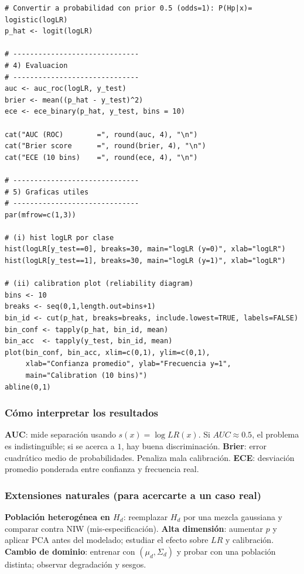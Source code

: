 \documentclass[a4paper,10pt,oneside]{article}
\begin{document}
\begin{verbatim}
# Convertir a probabilidad con prior 0.5 (odds=1): P(Hp|x)= logistic(logLR)
p_hat <- logit(logLR)

# ------------------------------
# 4) Evaluacion
# ------------------------------
auc <- auc_roc(logLR, y_test)
brier <- mean((p_hat - y_test)^2)
ece <- ece_binary(p_hat, y_test, bins = 10)

cat("AUC (ROC)        =", round(auc, 4), "\n")
cat("Brier score      =", round(brier, 4), "\n")
cat("ECE (10 bins)    =", round(ece, 4), "\n")

# ------------------------------
# 5) Graficas utiles
# ------------------------------
par(mfrow=c(1,3))

# (i) hist logLR por clase
hist(logLR[y_test==0], breaks=30, main="logLR (y=0)", xlab="logLR")
hist(logLR[y_test==1], breaks=30, main="logLR (y=1)", xlab="logLR")

# (ii) calibration plot (reliability diagram)
bins <- 10
breaks <- seq(0,1,length.out=bins+1)
bin_id <- cut(p_hat, breaks=breaks, include.lowest=TRUE, labels=FALSE)
bin_conf <- tapply(p_hat, bin_id, mean)
bin_acc  <- tapply(y_test, bin_id, mean)
plot(bin_conf, bin_acc, xlim=c(0,1), ylim=c(0,1),
     xlab="Confianza promedio", ylab="Frecuencia y=1",
     main="Calibration (10 bins)")
abline(0,1)
\end{verbatim}

\subsubsection*{C\'omo interpretar los resultados}

\textbf{AUC}: mide separaci\'on usando $s(x)=\log LR(x)$. Si $AUC\approx 0.5$, el problema es indistinguible; si se acerca a $1$, hay buena discriminaci\'on. \textbf{Brier}: error cuadr\'atico medio de probabilidades. Penaliza mala calibraci\'on. \textbf{ECE}: desviaci\'on promedio ponderada entre confianza y frecuencia real.


\subsubsection*{Extensiones naturales (para acercarte a un caso real)}

\textbf{Poblaci\'on heterog\'enea en $H_d$}: reemplazar $H_d$ por una mezcla gaussiana y comparar contra NIW (mis-especificaci\'on). \textbf{Alta dimensi\'on}: aumentar $p$ y aplicar PCA antes del modelado; estudiar el efecto sobre $LR$ y calibraci\'on. \textbf{Cambio de dominio}: entrenar con $(\mu_d,\Sigma_d)$ y probar con una poblaci\'on distinta; observar degradaci\'on y sesgos.
\end{document}
